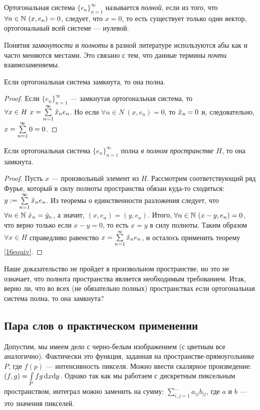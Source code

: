 \begin{Def}
Ортогональная система $\{e_n\}_{n=1}^{\infty}$ называется \textit{полной}, если из того, что $\forall n \in \mathbb{N} \ (x, e_n) = 0$, следует, что $x = 0$, то есть существует только один вектор, ортогональный всей системе --- нулевой.
\end{Def}

Понятия \textit{замкнутости} и \textit{полноты} в разной литературе используются абы как и часто меняются местами. Это связано с тем, что данные термины \textit{почти} взаимозаменяемы.

\begin{Statement}
Если ортогональная система замкнута, то она полна.
\end{Statement}
\begin{proof}
Если $\{e_n\}_{n=1}^{\infty}$ --- замкнутая ортогональная система, то $\forall x \in H\ x = \sum\limits_{n=1}^{\infty}\hat{x}_ne_n$. Но если $\forall n \in N\ (x, e_n) = 0$, то $\hat{x}_n = 0$ и, следовательно, $x = \sum\limits_{n=1}^{\infty} 0 = 0$. 
\end{proof}

\begin{Statement}
Если ортогональная система $\{e_n\}_{n=1}^{\infty}$ полна \textit{в полном пространстве $H$}, то она замкнута.
\end{Statement}
\begin{proof}
Пусть $x$ --- произвольный элемент из $H$. Рассмотрим соответствующий ряд Фурье, который в силу полноты пространства обязан куда-то сходиться: $y := \sum\limits_{n=1}^{\infty} \hat{x}_ne_n$. Из теоремы о единственности разложения следует, что $\forall n \in \mathbb{N}\ \hat{x}_n = \hat{y}_n$, а значит, $(x, e_n) = (y, e_n)$. Итого, $\forall n \in \mathbb{N} \ (x - y, e_n) = 0$, что верно только если $x - y = 0$, то есть $x = y$ в силу полноты. Таким образом $\forall x \in H $ справедливо равенство $  x = \sum\limits_{n=1}^{\infty} \hat{x}_ne_n$, и осталось применить теорему \ref{16equiv}.
\end{proof}
\begin{Task}
Наше доказательство не пройдет в произвольном пространстве, но это не означает, что полнота пространства является необходимым требованием. Итак, верно ли, что во всех (не обязательно полных) пространствах если ортогональная система полна, то она замкнута?
\end{Task}

\subsection{Пара слов о практическом применении}
Допустим, мы имеем дело с черно-белым изображением (с цветным все аналогично). Фактически это функция, заданная на пространстве-прямоугольнике $P$, где $f(p)$ --- интенсивность пикселя. Можно ввести скалярное произведение: $(f, g) = \int\limits_P fg \,\mathrm{d} x\mathrm{d} y$. Однако так как мы работаем с дискретным пиксельным пространством, интеграл можно заменить на сумму: $\sum\limits_{i, j = 1}^{\dots}a_{ij}b_{ij}$, где $a$ и $b$ --- это значения пикселей.

